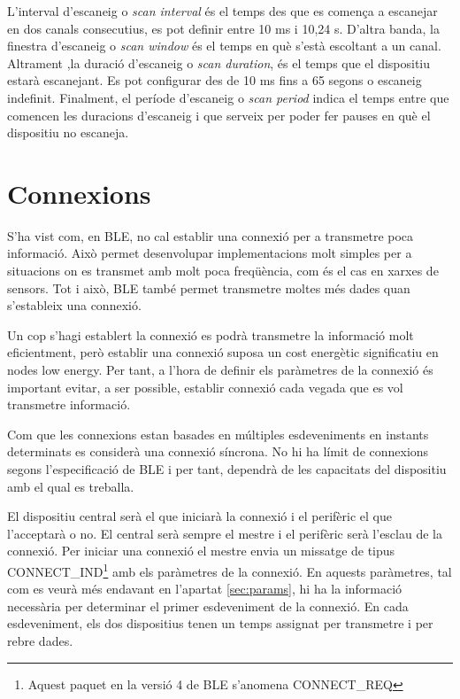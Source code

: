 L'interval d'escaneig o \textit{scan interval} és el temps des que es comença a escanejar en dos canals consecutius, es pot definir entre 10 ms i 10,24 s.
D'altra banda, la finestra d'escaneig o \textit{scan window} és el temps en què s'està escoltant a un canal.
Altrament ,la duració d'escaneig o \textit{scan duration}, és el temps que el dispositiu estarà escanejant.
Es pot configurar des de 10 ms fins a 65 segons o escaneig indefinit.
Finalment, el període d'escaneig o \textit{scan period} indica el temps entre que comencen les duracions d'escaneig i que serveix per poder fer pauses en què el dispositiu no escaneja.


\section{Connexions}
S'ha vist com, en BLE, no cal establir una connexió per a transmetre poca informació.
Això permet desenvolupar implementacions molt simples per a situacions on es transmet amb molt poca freqüència, com és el cas en xarxes de sensors.
Tot i això, BLE també permet transmetre moltes més dades quan s'estableix una connexió.

Un cop s'hagi establert la connexió es podrà transmetre la informació molt eficientment, però establir una connexió suposa un cost energètic significatiu en nodes low energy.
Per tant, a l'hora de definir els paràmetres de la connexió és important evitar, a ser possible, establir connexió cada vegada que es vol transmetre informació.

Com que les connexions estan basades en múltiples esdeveniments en instants determinats es considerà una connexió síncrona.
No hi ha límit de connexions segons l'especificació de BLE i per tant, dependrà de les capacitats del dispositiu amb el qual es treballa.


El dispositiu central serà el que iniciarà la connexió i el perifèric el que l'acceptarà o no.
El central serà sempre el mestre i el perifèric serà l'esclau de la connexió.
Per iniciar una connexió el mestre envia un missatge de tipus CONNECT\_IND\footnote{Aquest paquet en la versió 4 de BLE s'anomena CONNECT\_REQ} amb els paràmetres de la connexió.
En aquests paràmetres, tal com es veurà més endavant en l'apartat \ref{sec:params}, hi ha la informació necessària per determinar el primer esdeveniment de la connexió.
En cada esdeveniment, els dos dispositius tenen un temps assignat per transmetre i per rebre dades.

